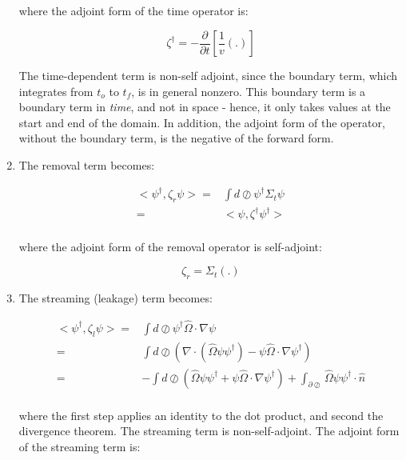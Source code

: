 \documentclass[10pt]{article}
\newcommand{\hO}{\hat{\Omega}}
\begin{document}
\begin{flushleft}
\begin{enumerate}
where the adjoint form of the time operator is:

\begin{equation}
\zeta^\dagger = -\frac{\partial}{\partial t}\left\lbrack\frac{1}{v}(.)\right\rbrack
\end{equation}

The time-dependent term is non-self adjoint, since the boundary term, which integrates from \(t_o\) to \(t_f\), is in general nonzero. This boundary term is a boundary term in \textit{time}, and not in space - hence, it only takes values at the start and end of the domain. In addition, the adjoint form of the operator, without the boundary term, is the negative of the forward form. 

\item The removal term becomes:

\begin{equation}
\begin{aligned}
<\psi^\dagger,\zeta_r\psi>= & \int d\oslash \psi^\dagger \Sigma_t\psi\\
= & <\psi,\zeta^\dagger\psi^\dagger>\\
\end{aligned}
\end{equation}

where the adjoint form of the removal operator is self-adjoint:

\begin{equation}
\zeta_r=\Sigma_t(.)
\end{equation}

\item The streaming (leakage) term becomes:

\begin{equation}
\begin{aligned}
<\psi^\dagger,\zeta_l\psi>= & \int d\oslash \psi^\dagger\hO  \cdot\nabla\psi\\
= & \int d\oslash \left(\nabla\cdot(\hO  \psi\psi^\dagger)-\psi\hO  \cdot\nabla\psi^\dagger\right)\\
= & -\int d\oslash \left(\hO  \psi\psi^\dagger +\psi\hO  \cdot\nabla\psi^\dagger\right)+ \int_{\partial\oslash}\hO  \psi\psi^\dagger\cdot\hat{n}\\
\end{aligned}
\end{equation}

where the first step applies an identity to the dot product, and second the divergence theorem. The streaming term is non-self-adjoint. The adjoint form of the streaming term is:


\end{enumerate}
\end{flushleft}
\end{document}
